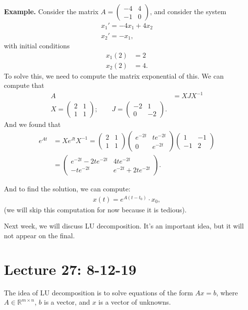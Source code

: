 \documentclass{article}
\newcommand{\mat}[1]{\begin{pmatrix}#1\end{pmatrix}}
\newcommand{\RR}{\mathbb{R}}
\begin{document}
{\bf Example.} Consider the matrix  $A = \mat{-4 & 4 \\ -1 & 0}$, and consider the system
\begin{align*}
  x_1' = -4 x_1 + 4 x_2 \\ 
  x_2' = -x_1,
\end{align*}
with initial conditions
\begin{align*}
  x_1(2) &= 2 \\
  x_2(2) &= 4.
\end{align*}
To solve this, we need to compute the matrix exponential of this.  We can compute that
\begin{align*}
  A &= X J X^{-1} \\
  X = \mat{2 & 1 \\ 1 & 1}; \qquad J = \mat{-2 & 1 \\ 0 & -2}.
\end{align*}
And we found that
\begin{align*}
  e^{At} &= X e^{Jt} X^{-1} = \mat{2 & 1 \\ 1 & 1} \mat{e^{-2t} & t e^{-2t} \\ 0 & e^{-2t}} \mat{1 & -1 \\ -1 & 2}  \\
  &= \mat{e^{-2t} -2t e^{-2t} & 4t e^{-2t} \\ -t e^{-2t} & e^{-2t} + 2t e^{-2t}}.
\end{align*}

And to find the solution, we can compute:
\begin{align*}
  x(t) = e^{A(t - t_0)} \cdot x_0,
\end{align*}
(we will skip this computation for now because it is tedious).

Next week, we will discuss LU decomposition.  It's an important idea, but it will not appear on the final.
\section{Lecture 27: 8-12-19}

The idea of LU decomposition is to solve equations of the form $Ax = b$, where $A \in \RR^{m \times n}$, $b$ is a vector, and $x$ is a vector of unknowns.
\end{document}
